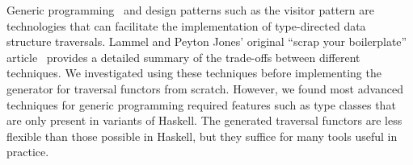 Generic
programming~\cite{jeuring+:polytypic-programming,hinze+:generic-programming,lammel+:syb}
and design patterns such as the visitor pattern are technologies that can
facilitate the implementation of type-directed data structure
traversals.  Lammel and Peyton Jones' original ``scrap your
boilerplate'' article~\cite{lammel+:syb} provides a detailed summary
of the trade-offs between different techniques.  We investigated using
these techniques before implementing the generator for
\padsml{} traversal functors from scratch.  However, we found most
advanced techniques for generic programming required
features such as type classes that are only present in variants of
Haskell.  The generated \padsml{} traversal functors are less flexible
than those possible in Haskell, but they suffice for many tools useful in practice. 





  




